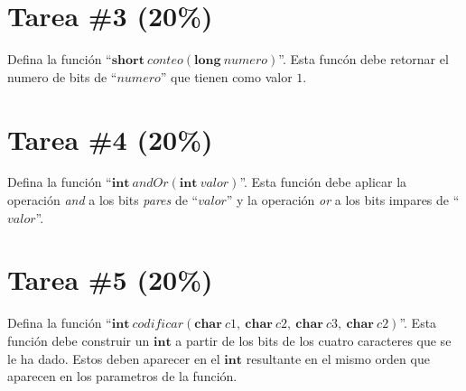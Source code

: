 \documentclass{article}
\begin{document}
\section*{Tarea \#3 (20\%)}

Defina la funci\'on ``$\mathbf{short}\ conteo(\mathbf{long}\ numero)$''. Esta func\'on debe retornar
el numero de bits de ``$numero$'' que tienen como valor $1$.

\section*{Tarea \#4 (20\%)}

Defina la funci\'on ``$\mathbf{int}\ andOr(\mathbf{int}\ valor)$''. Esta funci\'on debe aplicar la
operaci\'on \emph{and} a los bits \emph{pares} de ``$valor$'' y la operaci\'on \emph{or} a los bits
impares de ``$valor$''.

\section*{Tarea \#5 (20\%)}

Defina la funci\'on ``$\mathbf{int}\ codificar(\mathbf{char}\ c1,\ \mathbf{char}\ c2,\ \mathbf{char}\ c3,\ \mathbf{char}\ c2)$''.
Esta funci\'on debe construir un $\mathbf{int}$ a partir de los bits de los cuatro caracteres que se le ha dado.
Estos deben aparecer en el $\mathbf{int}$ resultante en el mismo orden que aparecen en los parametros de la funci\'on.
\end{document}
